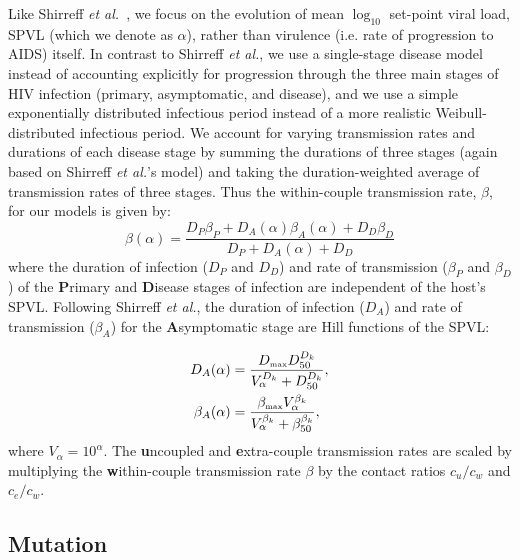 \documentclass[10pt,letterpaper]{article}
\newcommand{\tsub}[2]{#1_{{\textrm{\tiny #2}}}}
\newcommand{\etal}{\textit{et al.}}
\newcommand{\tsub}[2]{#1_{{\textrm{\tiny #2}}}}
\begin{document}
Like Shirreff \etal\ \cite{shirreff_transmission_2011}, we focus on the evolution of mean $\log_{10}$ set-point viral load, SPVL (which we denote as $\alpha$), rather than virulence (i.e. rate of progression to AIDS) itself. 
In contrast to Shirreff \etal, we use a single-stage disease model instead of accounting explicitly for progression through the three main stages of HIV infection (primary, asymptomatic, and disease), and we use a simple exponentially distributed infectious period instead of a more realistic Weibull-distributed infectious period. We account for varying transmission rates and durations of each disease stage by summing the durations of three stages (again based on Shirreff \etal's model) and taking the duration-weighted average of transmission rates of three stages. Thus the within-couple transmission rate, $\beta$, for our models is given by:
\begin{equation}
\beta (\alpha) = \frac{D_P \beta_P + D_A (\alpha) \beta_A (\alpha) + D_D \beta_D}{D_P + D_A (\alpha) + D_D}
\end{equation}
where the duration of infection ($D_P$ and $D_D$) and rate of transmission ($\beta_P$ and $\beta_D$) of the \textbf{P}rimary and \textbf{D}isease stages
of infection are independent of the host's SPVL. Following Shirreff \textit{et al.}, the duration of infection ($D_A$) and rate of transmission ($\beta_A$) for the \textbf{A}symptomatic stage are Hill functions of the SPVL:

\begin{equation}
\begin{split}
D_A(\alpha) &= \frac{\tsub{D}{max} D_{50} ^{D_k}}{V_\alpha ^{D_k} + D_{50}^{D_k}}, \\
\beta_A(\alpha) &= \frac{\tsub{\beta}{max} V_\alpha ^ {\beta_k}}%
{V_\alpha^{\beta_k} + \beta_{50} ^{\beta_k}},
\end{split}
\end{equation}
where $V_{\alpha} = 10^\alpha$. 
The \textbf{u}ncoupled and \textbf{e}xtra-couple transmission rates are scaled by multiplying the \textbf{w}ithin-couple transmission rate $\beta$ by the contact ratios $c_u/c_w$ and $c_e/c_w$.

\subsection*{Mutation}
\end{document}
